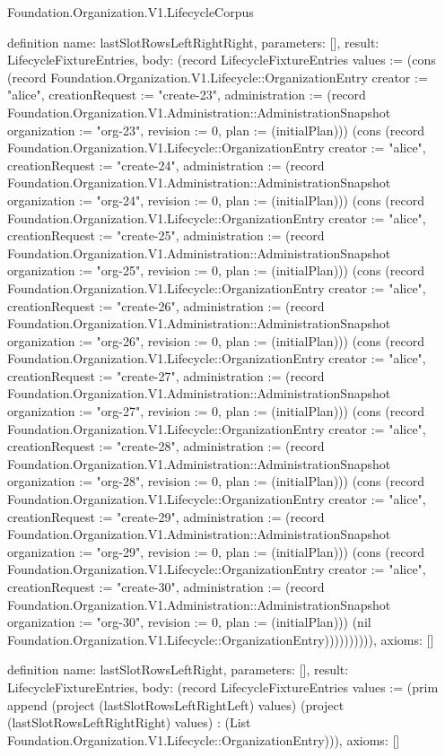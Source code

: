 \begin{lexlean}{Foundation.Organization.V1.LifecycleCorpus}
\begin{semanticmodule}
definition{
  name: lastSlotRowsLeftRightRight,
  parameters: [],
  result: LifecycleFixtureEntries,
  body: (record LifecycleFixtureEntries {values := (cons (record Foundation.Organization.V1.Lifecycle::OrganizationEntry {creator := "alice", creationRequest := "create-23", administration := (record Foundation.Organization.V1.Administration::AdministrationSnapshot {organization := "org-23", revision := 0, plan := (initialPlan)})}) (cons (record Foundation.Organization.V1.Lifecycle::OrganizationEntry {creator := "alice", creationRequest := "create-24", administration := (record Foundation.Organization.V1.Administration::AdministrationSnapshot {organization := "org-24", revision := 0, plan := (initialPlan)})}) (cons (record Foundation.Organization.V1.Lifecycle::OrganizationEntry {creator := "alice", creationRequest := "create-25", administration := (record Foundation.Organization.V1.Administration::AdministrationSnapshot {organization := "org-25", revision := 0, plan := (initialPlan)})}) (cons (record Foundation.Organization.V1.Lifecycle::OrganizationEntry {creator := "alice", creationRequest := "create-26", administration := (record Foundation.Organization.V1.Administration::AdministrationSnapshot {organization := "org-26", revision := 0, plan := (initialPlan)})}) (cons (record Foundation.Organization.V1.Lifecycle::OrganizationEntry {creator := "alice", creationRequest := "create-27", administration := (record Foundation.Organization.V1.Administration::AdministrationSnapshot {organization := "org-27", revision := 0, plan := (initialPlan)})}) (cons (record Foundation.Organization.V1.Lifecycle::OrganizationEntry {creator := "alice", creationRequest := "create-28", administration := (record Foundation.Organization.V1.Administration::AdministrationSnapshot {organization := "org-28", revision := 0, plan := (initialPlan)})}) (cons (record Foundation.Organization.V1.Lifecycle::OrganizationEntry {creator := "alice", creationRequest := "create-29", administration := (record Foundation.Organization.V1.Administration::AdministrationSnapshot {organization := "org-29", revision := 0, plan := (initialPlan)})}) (cons (record Foundation.Organization.V1.Lifecycle::OrganizationEntry {creator := "alice", creationRequest := "create-30", administration := (record Foundation.Organization.V1.Administration::AdministrationSnapshot {organization := "org-30", revision := 0, plan := (initialPlan)})}) (nil Foundation.Organization.V1.Lifecycle::OrganizationEntry)))))))))}),
  axioms: []
}

definition{
  name: lastSlotRowsLeftRight,
  parameters: [],
  result: LifecycleFixtureEntries,
  body: (record LifecycleFixtureEntries {values := (prim append (project (lastSlotRowsLeftRightLeft) values) (project (lastSlotRowsLeftRightRight) values) : (List Foundation.Organization.V1.Lifecycle::OrganizationEntry))}),
  axioms: []
}


\end{semanticmodule}
\end{lexlean}
